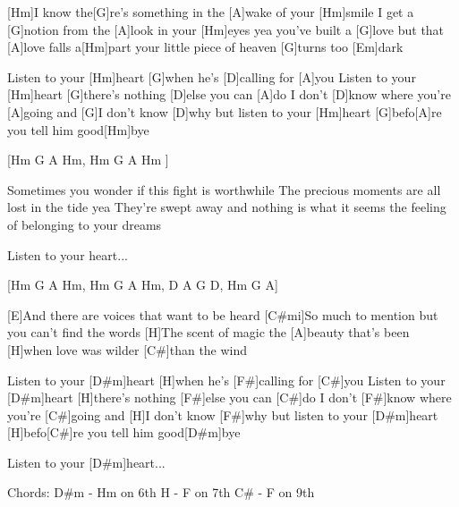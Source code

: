 
[Hm]I know the[G]re's something in the [A]wake of your [Hm]smile
I get a [G]notion from the [A]look in your [Hm]eyes yea
you've built a [G]love but that [A]love falls a[Hm]part
your little piece of heaven [G]turns too [Em]dark

Listen to your [Hm]heart
[G]when he's [D]calling for [A]you
Listen to your [Hm]heart
[G]there's nothing [D]else you can [A]do
I don't [D]know where you're [A]going
and [G]I don't know [D]why
but listen to your [Hm]heart
[G]befo[A]re you tell him good[Hm]bye

[Hm G A Hm, Hm G A Hm ] 

Sometimes you wonder if this fight is worthwhile
The precious moments are all lost in the tide yea
They're swept away and nothing is what it seems
the feeling of belonging to your dreams

Listen to your heart...

[Hm G A Hm, Hm G A Hm, D A G D, Hm G A]

[E]And there are voices that want to be heard
[C#mi]So much to mention but you can't find the words
[H]The scent of magic the [A]beauty that's been
[H]when love was wilder [C#]than the wind

Listen to your [D#m]heart
[H]when he's [F#]calling for [C#]you
Listen to your [D#m]heart
[H]there's nothing [F#]else you can [C#]do
I don't [F#]know where you're [C#]going
and [H]I don't know [F#]why
but listen to your [D#m]heart
[H]befo[C#]re you tell him good[D#m]bye

Listen to your [D#m]heart...



Chords: D\#m - Hm on 6th
H - F on 7th
C\# - F on 9th

